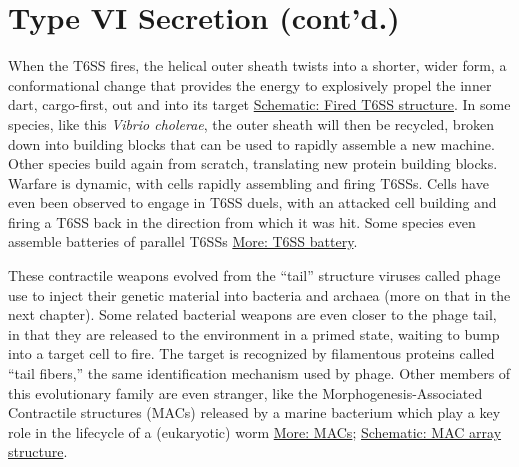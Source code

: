 \documentclass[]{tufte-book}
\begin{document}
\section{Type VI Secretion (cont'd.)}\label{type-vi-secretion-contd.}

When the T6SS fires, the helical outer sheath twists into a shorter,
wider form, a conformational change that provides the energy to
explosively propel the inner dart, cargo-first, out and into its target
\protect\hyperlink{Fired_T6SS_structure}{Schematic: Fired T6SS
structure}. In some species, like this \emph{Vibrio cholerae}, the outer
sheath will then be recycled, broken down into building blocks that can
be used to rapidly assemble a new machine. Other species build again
from scratch, translating new protein building blocks. Warfare is
dynamic, with cells rapidly assembling and firing T6SSs. Cells have even
been observed to engage in T6SS duels, with an attacked cell building
and firing a T6SS back in the direction from which it was hit. Some
species even assemble batteries of parallel T6SSs
\protect\hyperlink{T6SS_battery}{More: T6SS battery}.

These contractile weapons evolved from the ``tail'' structure viruses
called phage use to inject their genetic material into bacteria and
archaea (more on that in the next chapter). Some related bacterial
weapons are even closer to the phage tail, in that they are released to
the environment in a primed state, waiting to bump into a target cell to
fire. The target is recognized by filamentous proteins called ``tail
fibers,'' the same identification mechanism used by phage. Other members
of this evolutionary family are even stranger, like the
Morphogenesis-Associated Contractile structures (MACs) released by a
marine bacterium which play a key role in the lifecycle of a
(eukaryotic) worm \protect\hyperlink{MACs}{More: MACs};
\protect\hyperlink{MAC_array_structure}{Schematic: MAC array structure}.
\end{document}
